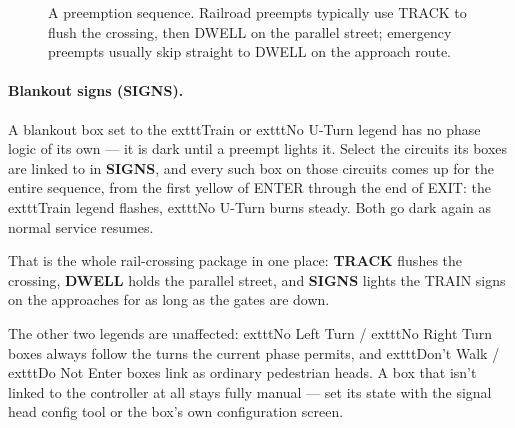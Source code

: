 \documentclass[11pt]{article}
\newcommand{\field}[1]{\textsf{\textbf{#1}}}
\begin{document}
\begin{figure}[H]
\centering
{}
\caption{A preemption sequence. Railroad preempts typically use TRACK to flush the
crossing, then DWELL on the parallel street; emergency preempts usually skip
straight to DWELL on the approach route.}
\label{fig:preempt}
\end{figure}

\paragraph{Blankout signs (SIGNS).}\label{sec:preemptsigns}
A blankout box set to the 	exttt{Train} or 	exttt{No U-Turn} legend has no phase
logic of its own — it is dark until a preempt lights it. Select the circuits its
boxes are linked to in \field{SIGNS}, and every such box on those circuits comes up
for the entire sequence, from the first yellow of ENTER through the end of EXIT: the
	exttt{Train} legend flashes, 	exttt{No U-Turn} burns steady. Both go dark again as
normal service resumes.

That is the whole rail-crossing package in one place: \field{TRACK} flushes the
crossing, \field{DWELL} holds the parallel street, and \field{SIGNS} lights the TRAIN
signs on the approaches for as long as the gates are down.

The other two legends are unaffected: 	exttt{No Left Turn} / 	exttt{No Right Turn}
boxes always follow the turns the current phase permits, and 	exttt{Don't Walk} /
	exttt{Do Not Enter} boxes link as ordinary pedestrian heads. A box that isn't linked
to the controller at all stays fully manual — set its state with the signal head
config tool or the box's own configuration screen.
\end{document}
